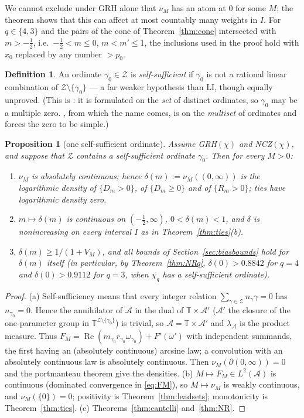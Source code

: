 \documentclass[11pt]{amsart}
\newtheorem{proposition}[theorem]{Proposition}
\theoremstyle{definition}
\newtheorem{definition}[theorem]{Definition}
\numberwithin{equation}{section}
\newcommand{\re}{\operatorname{Re}}
\newcommand{\cA}{\mathcal A}          %
\newcommand{\cZ}{\mathcal Z}          %
\newcommand{\hA}{\lambda_{\cA}}       %
\begin{document}
We cannot exclude under GRH alone that $\nu_M$ has an atom at $0$ for
some $M$; the theorem shows that this can affect at most countably
many weights in $I$. For $q\in\{4,3\}$ and the pairs of the cone of
Theorem~\ref{thm:cone} intersected with $m>-\tfrac12$, i.e.\
$-\tfrac12<m\le0$, $m<m'\le1$, the inclusions used in the proof hold
with $x_0$ replaced by any number $>p_0$.

\begin{definition}\label{def:selfsuff}
An ordinate $\gamma_0\in\cZ$ is \emph{self-sufficient} if $\gamma_0$
is not a rational linear combination of $\cZ\setminus\{\gamma_0\}$ ---
a far weaker hypothesis than LI, though equally unproved. (This is
\cite[Definition~5.3]{Dev20}: it is formulated on the \emph{set} of
distinct ordinates, so $\gamma_0$ may be a multiple zero.
\cite[Definition~1.3]{MN20}, from which the name comes, is on the
\emph{multiset} of ordinates and forces the zero to be simple.)
\end{definition}

\begin{proposition}[one self-sufficient ordinate]\label{prop:selfsuff}
Assume GRH$(\chi)$ and NCZ$(\chi)$, and suppose that $\cZ$ contains a
self-sufficient ordinate $\gamma_0$. Then for every $M>0$:
\begin{enumerate}
\item[(a)] $\nu_M$ is absolutely continuous; hence
$\delta(m):=\nu_M((0,\infty))$ is the logarithmic density of
$\{D_m>0\}$, of $\{D_m\ge0\}$ and of $\{R_m>0\}$; ties have
logarithmic density zero.
\item[(b)] $m\mapsto\delta(m)$ is continuous on $(-\tfrac12,\infty)$,
$0<\delta(m)<1$, and $\delta$ is nonincreasing on every interval $I$
as in Theorem~\ref{thm:ties}(b).
\item[(c)] $\delta(m)\ge1/(1+V_M)$, and all bounds of
Section~\ref{sec:biasbounds} hold for $\delta(m)$ itself (in
particular, by Theorem~\ref{thm:NRq}, $\delta(0)>0.8842$ for $q=4$
and $\delta(0)>0.9112$ for $q=3$, when $\chi_q$ has a self-sufficient
ordinate).
\end{enumerate}
\end{proposition}

\begin{proof}
(a) Self-sufficiency means that every integer relation
$\sum_{\gamma\in\cZ}n_\gamma\gamma=0$ has $n_{\gamma_0}=0$. Hence the
annihilator of $\cA$ in the dual of $\mathbb T\times\cA'$ ($\cA'$ the
closure of the one-parameter group in
$\mathbb T^{\cZ\setminus\{\gamma_0\}}$) is trivial, so
$\cA=\mathbb T\times\cA'$ and $\hA$ is the product measure. Thus
$F_M=\re(m_{\gamma_0}r_{\gamma_0}\omega_{\gamma_0})+F'(\omega')$ with
independent summands, the first having an (absolutely continuous)
arcsine law; a convolution with an absolutely continuous law is
absolutely continuous. Then $\nu_M(\partial(0,\infty))=0$ and the
portmanteau theorem give the densities. (b) $M\mapsto F_M\in L^2(\cA)$
is continuous (dominated convergence in \eqref{eq:FM}), so
$M\mapsto\nu_M$ is weakly continuous, and $\nu_M(\{0\})=0$;
positivity is Theorem~\ref{thm:leadsets}; monotonicity is
Theorem~\ref{thm:ties}. (c) Theorems~\ref{thm:cantelli}
and~\ref{thm:NR}.
\end{proof}
\end{document}
